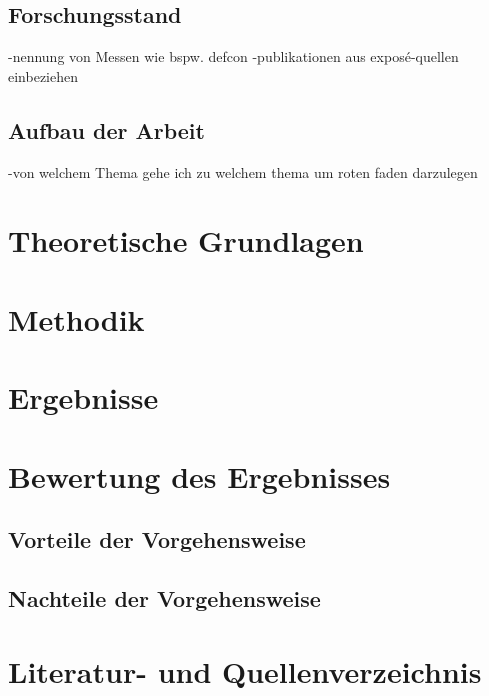 \documentclass[12pt,oneside]{article}
\begin{document}
\subsection{Forschungsstand}
-nennung von Messen wie bspw. defcon
\newline
-publikationen aus exposé-quellen einbeziehen
\subsection{Aufbau der Arbeit}
-von welchem Thema gehe ich zu welchem thema um roten faden darzulegen


\section{Theoretische Grundlagen} 






\newpage

\section{Methodik}



\section{Ergebnisse}
\newpage

\section{Bewertung des Ergebnisses}
\subsection{Vorteile der Vorgehensweise}
\subsection{Nachteile der Vorgehensweise}
\newpage


\newpage 


\section{Literatur- und Quellenverzeichnis}
\end{document}
